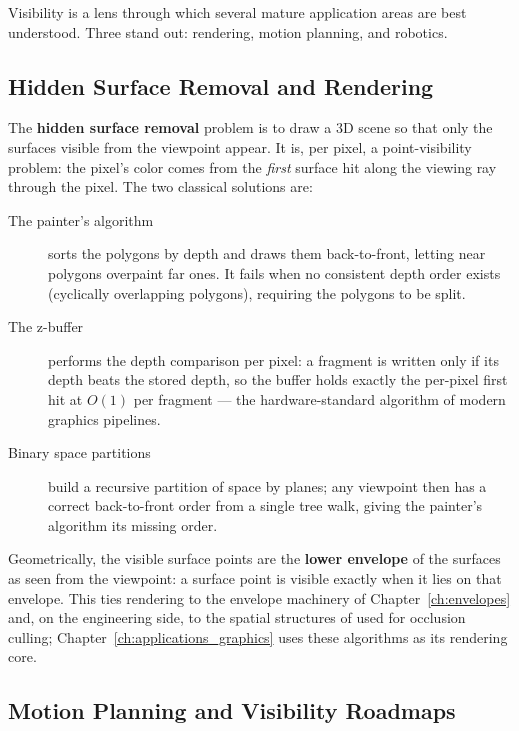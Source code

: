 Visibility is a lens through which several mature application areas are best
understood. Three stand out: rendering, motion planning, and robotics.

\subsection*{Hidden Surface Removal and Rendering}

The \textbf{hidden surface removal} problem is to draw a 3D scene so that
only the surfaces visible from the viewpoint appear. It is, per pixel, a
point-visibility problem: the pixel's color comes from the \emph{first}
surface hit along the viewing ray through the pixel. The two classical
solutions are:

\begin{description}
  \item[The painter's algorithm] \cite{newell1972} sorts the polygons by
    depth and draws them back-to-front, letting near polygons overpaint far
    ones. It fails when no consistent depth order exists (cyclically
    overlapping polygons), requiring the polygons to be split.
  \item[The z-buffer] \cite{catmull1974} performs the depth comparison per
    pixel: a fragment is written only if its depth beats the stored depth,
    so the buffer holds exactly the per-pixel first hit at $O(1)$ per
    fragment --- the hardware-standard algorithm of modern graphics
    pipelines.
  \item[Binary space partitions] \cite{fuchs1980,naylor1990} build a
    recursive partition of space by planes; any viewpoint then has a
    correct back-to-front order from a single tree walk, giving the
    painter's algorithm its missing order.
\end{description}

Geometrically, the visible surface points are the \textbf{lower envelope}
of the surfaces as seen from the viewpoint: a surface point is visible
exactly when it lies on that envelope. This ties rendering to the envelope
machinery of Chapter~\ref{ch:envelopes} and, on the engineering side, to
the spatial structures of \cite{ericson2004} used for occlusion culling;
Chapter~\ref{ch:applications_graphics} uses these algorithms as its
rendering core.

\subsection*{Motion Planning and Visibility Roadmaps}


